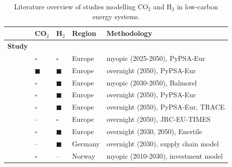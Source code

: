 \documentclass[pdflatex,sn-nature]{sn-jnl}%
\theoremstyle{thmstyleone}%
\theoremstyle{thmstyletwo}%
\theoremstyle{thmstylethree}%
\begin{document}
\begin{table}[htbp]
  \centering
  \caption{Literature overview of studies modelling CO$_2$ and H$_2$ in low-carbon energy systems.}
  \label{tab:literature}
  \scriptsize
  \begin{tabularx}{\linewidth}{R{1.3cm}>{\hsize\centering\arraybackslash}X>{\hsize\centering\arraybackslash}X>{\hsize\centering\arraybackslash}X>{\hsize\centering\arraybackslash}X}
    \toprule
    & \textbf{CO$_2$} & \textbf{H$_2$} & \textbf{Region} & \textbf{Methodology} \\
    \midrule
    \textbf{Study} & & & & \\
    \cite{vangreevenbroekLittleLoseCase2025} & $\square$ & $\square$ & Europe & myopic (2025-2050), PyPSA-Eur\\
    \cite{hofmannH2CO2Network2025} & $\blacksquare$ & $\blacksquare$ & Europe & overnight (2050), PyPSA-Eur\\
    \cite{kountourisUnifiedEuropeanHydrogen2024} & $\square$  & $\blacksquare$ & Europe & myopic (2030-2050), Balmorel \cite{wieseBalmorelOpenSource2018} \\
    \cite{neumannPotentialRoleHydrogen2023} & $\square$ & $\blacksquare$ & Europe & overnight (2050), PyPSA-Eur \\
    \cite{neumannGreenEnergySteel2025} & $\square$ & $\blacksquare$ & Europe & overnight (2050), PyPSA-Eur, TRACE \cite{hamppImportOptionsChemical2023} \\
    \cite{beresWillHydrogenSynthetic2024} & -- & $\square$ & Europe & overnight (2050), JRC-EU-TIMES \\
    \cite{fleiterHydrogenInfrastructureFuture2025} & $\square$ & $\blacksquare$ & Europe & overnight (2030, 2050), Enertile \\
    \cite{cerniauskasOptionsNaturalGas2020} & -- & $\blacksquare$ & Germany & overnight (2030), supply chain model \cite{reussSeasonalStorageAlternative2017} \\
    \cite{bakkenLinearModelsOptimization2008} & $\square$ & -- & Norway & myopic (2010-2030), investment model \\
    \bottomrule
  \end{tabularx}
  \centering
\end{table}
\end{document}
